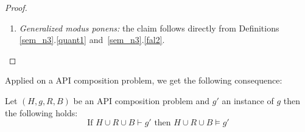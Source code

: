 \begin{proof}
\begin{enumerate}
\item \emph{Generalized modus ponens:} the claim follows directly from Definitions \ref{sem_n3}.\ref{quant1} %
and~\ref{sem_n3}.\ref{fal2}.
\end{enumerate}
\end{proof}

Applied on a API composition problem, we get the following consequence:
\begin{corollary}
Let $(H,g,R,B)$ be an API composition problem and $g'$ an instance  of $g$ then the following holds:
\[\text{If }H\cup R \cup B \vdash g' \text{ then }H\cup R \cup B \models g'\]
\end{corollary}




